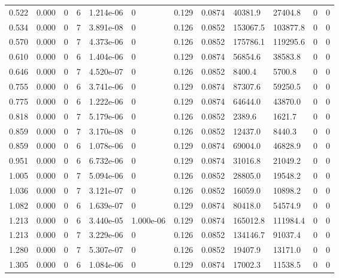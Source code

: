 \documentclass[preview]{standalone}
\begin{document}
{{\begin{tabular}{L{1.2cm}C{1.2cm} C{0.3cm}C{0.5cm} C{1.4cm}C{1.4cm} C{1.4cm}C{1.4cm} C{1.6cm}C{1.6cm} C{1.6cm}C{1.6cm}}
  0.522  &  0.000  & 0     &  6 &  1.214e-06  & 0  &  0.129&   0.0874& 40381.9 & 27404.8   &  0 & 0  \\ 
  0.534  &  0.000  & 0     &  7 &  3.891e-08  & 0  &  0.126&   0.0852& 153067.5 & 103877.8   &  0 & 0  \\ 
  0.570  &  0.000  & 0     &  7 &  4.373e-06  & 0  &  0.126&   0.0852& 175786.1 & 119295.6   &  0 & 0  \\ 
  0.610  &  0.000  & 0     &  6 &  1.404e-06  & 0  &  0.129&   0.0874& 56854.6 & 38583.8   &  0 & 0  \\ 
  0.646  &  0.000  & 0     &  7 &  4.520e-07  & 0  &  0.126&   0.0852& 8400.4 & 5700.8   &  0 & 0  \\ 
  0.755  &  0.000  & 0     &  6 &  3.741e-06  & 0  &  0.129&   0.0874& 87307.6 & 59250.5   &  0 & 0  \\ 
  0.775  &  0.000  & 0     &  6 &  1.222e-06  & 0  &  0.129&   0.0874& 64644.0 & 43870.0   &  0 & 0  \\ 
  0.818  &  0.000  & 0     &  7 &  5.179e-06  & 0  &  0.126&   0.0852& 2389.6 & 1621.7   &  0 & 0  \\ 
  0.859  &  0.000  & 0     &  7 &  3.170e-08  & 0  &  0.126&   0.0852& 12437.0 & 8440.3   &  0 & 0  \\ 
  0.859  &  0.000  & 0     &  6 &  1.078e-06  & 0  &  0.129&   0.0874& 69004.0 & 46828.9   &  0 & 0  \\ 
  0.951  &  0.000  & 0     &  6 &  6.732e-06  & 0  &  0.129&   0.0874& 31016.8 & 21049.2   &  0 & 0  \\ 
  1.005  &  0.000  & 0     &  7 &  5.094e-06  & 0  &  0.126&   0.0852& 28805.0 & 19548.2   &  0 & 0  \\ 
  1.036  &  0.000  & 0     &  7 &  3.121e-07  & 0  &  0.126&   0.0852& 16059.0 & 10898.2   &  0 & 0  \\ 
  1.082  &  0.000  & 0     &  6 &  1.639e-07  & 0  &  0.129&   0.0874& 80418.0 & 54574.9   &  0 & 0  \\ 
  1.213  &  0.000  & 0     &  6 &  3.440e-05  & 1.000e-06  &  0.129&   0.0874& 165012.8 & 111984.4   &  0 & 0  \\ 
  1.213  &  0.000  & 0     &  7 &  3.229e-06  & 0  &  0.126&   0.0852& 134146.7 & 91037.4   &  0 & 0  \\ 
  1.280  &  0.000  & 0     &  7 &  5.307e-07  & 0  &  0.126&   0.0852& 19407.9 & 13171.0   &  0 & 0  \\ 
  1.305  &  0.000  & 0     &  6 &  1.084e-06  & 0  &  0.129&   0.0874& 17002.3 & 11538.5   &  0 & 0  \\ 

\end{tabular}}}
\end{document}
